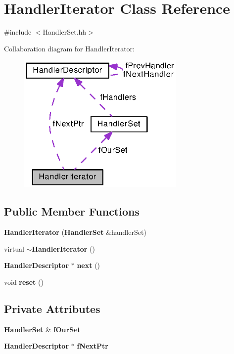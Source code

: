 \section{Handler\+Iterator Class Reference}
\label{classHandlerIterator}


{\ttfamily \#include $<$Handler\+Set.\+hh$>$}



Collaboration diagram for Handler\+Iterator\+:
\nopagebreak
\begin{figure}[H]
\begin{center}
\leavevmode
\includegraphics[width=231pt]{classHandlerIterator__coll__graph}
\end{center}
\end{figure}
\subsection*{Public Member Functions}
\begin{DoxyCompactItemize}
\item 
{\bf Handler\+Iterator} ({\bf Handler\+Set} \&handler\+Set)
\item 
virtual {\bf $\sim$\+Handler\+Iterator} ()
\item 
{\bf Handler\+Descriptor} $\ast$ {\bf next} ()
\item 
void {\bf reset} ()
\end{DoxyCompactItemize}
\subsection*{Private Attributes}
\begin{DoxyCompactItemize}
\item 
{\bf Handler\+Set} \& {\bf f\+Our\+Set}
\item 
{\bf Handler\+Descriptor} $\ast$ {\bf f\+Next\+Ptr}
\end{DoxyCompactItemize}


